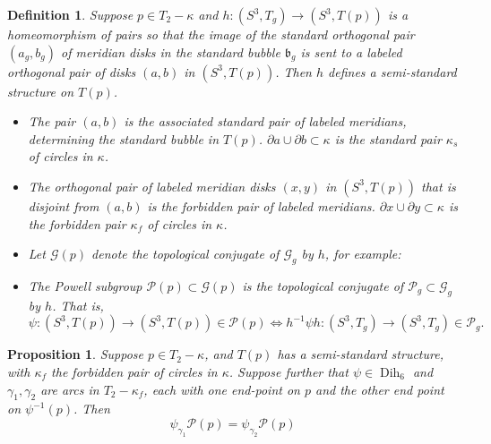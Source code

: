 \documentclass[12pt]{amsart}
\newtheorem{defin}[thm]{Definition}
\newtheorem{prop}[thm]{Proposition}
\newcommand{\calG}{\mathcal G}
\newcommand{\calP}{\mathcal P}
\newcommand{\bdd}{\mbox{$\partial$}}
\newcommand{\Dih}{\operatorname{Dih}}
\newcommand{\frb}{\mathfrak{b}}
\begin{document}
\begin{defin} \label{defin:semistand}  Suppose $p \in T_2 - \kappa$ and  $h:(S^3, T_g) \to (S^3, T(p))$ is a homeomorphism of pairs so that the image of the standard orthogonal pair $(a_g, b_g)$ of meridian disks in the standard bubble $\frb_g$ is sent to a labeled orthogonal pair of disks $(a, b)$ in $(S^3, T(p))$.  Then $h$ defines a {\em semi-standard} structure on $T(p)$.  
\begin{itemize} 
\item The pair $(a, b)$ is the associated {\em standard pair} of labeled meridians, determining the {\em standard bubble} in $T(p)$.  $\bdd a \cup \bdd b \subset \kappa$ is the {\em standard pair $\kappa_s$} of circles in $\kappa$.

\item The orthogonal pair of labeled meridian disks $(x, y)$ in $(S^3, T(p))$ that is disjoint from $(a, b)$ is the {\em forbidden pair} of labeled meridians. $\bdd x \cup \bdd y \subset \kappa$ is the forbidden pair $\kappa_f$ of circles in $\kappa$.

\item Let $\calG(p)$ denote the topological conjugate of $\calG_g$ by $h$, for example: 

\item The Powell subgroup $\calP(p) \subset \calG(p)$ is the topological conjugate of $\calP_g \subset \calG_g$ by $h$.  That is,
 \[\psi: (S^3, T(p)) \to (S^3, T(p)) \in \calP(p) \iff h^{-1}\psi h: (S^3, T_g) \to (S^3, T_g) \in \calP_g.\]
 \end{itemize}
\end{defin}

\begin{prop} \label{prop:G/P}  Suppose $p \in T_2 - \kappa$, and $T(p)$ has a semi-standard structure, with $\kappa_f$ the forbidden pair of circles in $\kappa$.  Suppose further that $\psi \in \Dih_6$ and $\gamma_1, \gamma_2$ are arcs in $T_2 - \kappa_f$, each with one end-point on $p$ and the other end point on $\psi^{-1}(p)$.  Then 
\[\psi_{\gamma_1} \calP(p) = \psi_{\gamma_2}\calP(p)\]
\end{prop}  
\end{document}
